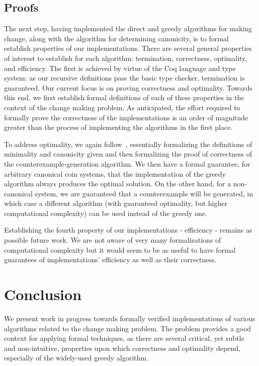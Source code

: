 \documentclass{sig-alternate}
\begin{document}
\subsection{Proofs}

The next step, having implemented the direct and greedy algorithms for making change, along with the algorithm for determining canonicity, is to formal establish properties of our implementations. There are several general properties of interest to establish for each algorithm: termination, correctness, optimality, and efficiency. The first is achieved by virtue of the Coq language and type system: as our recursive definitions pass the basic type checker, termination is guaranteed. Our current focus is on proving correctness and optimality. Towards this end, we first establish formal definitions of each of these properties in the context of the change making problem. As anticipated, the effort required to formally prove the correctness of the implementations  is  an order of magnitude greater than the process of implementing the algorithms in the first place. 

To address optimality, we again follow~\cite{pearson94}, essentially formalizing the definitions of minimality and canonicity given and then formalizing the proof of correctness of the counterexample-generation algorithm. We then have a formal guarantee, for arbitrary canonical coin systems, that the implementation of the greedy algorithm always produces the optimal solution. On the other hand, for a non-canonical system, we are guaranteed that a counterexample will be generated, in which case a different algorithm (with guaranteed optimality, but higher computational complexity) can be used instead of the greedy one.

Establishing the fourth property of our implementations - efficiency - remains as possible future work. We are not aware of very many formalizations of computational complexity but it would seem to be as useful to have formal guarantees of  implementations' efficiency as well as their correctness.


\section{Conclusion}

We present work in progress towards formally verified implementations of various algorithms related to the change making problem. The problem provides a good context for applying formal techniques, as there are several critical, yet subtle and non-intuitive, properties upon which correctness and optimality depend, especially of the widely-used greedy algorithm.




\end{document}
